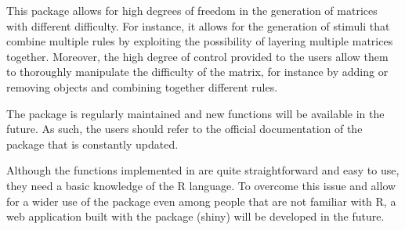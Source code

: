 This package allows for high degrees of freedom in the generation of matrices with different difficulty.
For instance, it allows for the generation of stimuli that combine multiple rules by exploiting the possibility of layering multiple matrices together.
Moreover, the high degree of control provided to the users allow them to thoroughly manipulate the difficulty of the matrix, for instance by adding or removing objects and combining together different rules.

The package is regularly maintained and new functions will be available in the future.
As such, the users should refer to the official documentation of the package that is constantly updated.

Although the functions implemented in  are quite straightforward and easy to use, they need a basic knowledge of the R language.
To overcome this issue and allow for a wider use of the package even among people that are not familiar with R, a web application built with the  package (shiny) will be developed in the future.


\address{%
Quietest Quokka\\
University of Little Mates\\%
Department of Letter Q\\ Somewhere, Australia\\
%
\url{https://www.britannica.com/animal/quokka}\\%
\textit{ORCiD: \href{https://orcid.org/0000-1721-1511-1101}{0000-1721-1511-1101}}\\%
\href{mailto:qquo@ulm.edu}{\nolinkurl{qquo@ulm.edu}}%
}

\address{%
Bounciest Bilby\\
University of Little MatesUniversity of Aussie Animals\\%
Department of Letter Q, Somewhere, Australia\\ Department of Marsupials, Somewhere, Australia\\
%
\url{https://www.britannica.com/animal/bilby}\\%
\textit{ORCiD: \href{https://orcid.org/0000-0002-0912-0225}{0000-0002-0912-0225}}\\%
\href{mailto:bbil@ulm.edu}{\nolinkurl{bbil@ulm.edu}}%
}